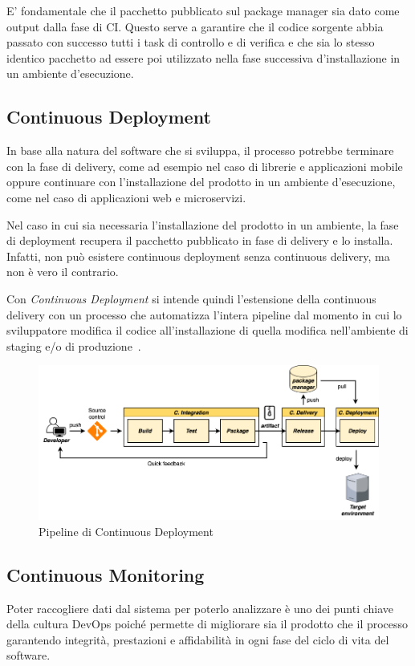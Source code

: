 E' fondamentale che il pacchetto pubblicato sul package manager sia dato come output dalla fase di CI. 
Questo serve a garantire che il codice sorgente abbia passato con successo tutti i task di controllo e di verifica e che sia lo stesso identico pacchetto ad essere poi utilizzato nella fase successiva d'installazione in un ambiente d'esecuzione. 

\subsection{Continuous Deployment}
In base alla natura del software che si sviluppa,
il processo potrebbe terminare con la fase di delivery, 
come ad esempio nel caso di librerie e applicazioni mobile oppure continuare con l'installazione del prodotto in un ambiente d'esecuzione,
come nel caso di applicazioni web e microservizi. 

Nel caso in cui sia necessaria l'installazione del prodotto in un ambiente, 
la fase di deployment recupera il pacchetto pubblicato in fase di delivery e lo installa. 
Infatti, 
non può esistere continuous deployment senza continuous delivery, 
ma non è vero il contrario.

Con \textit{Continuous Deployment} si intende quindi l'estensione della continuous delivery con un processo che automatizza l'intera pipeline dal momento in cui lo sviluppatore modifica il codice all'installazione di quella modifica nell'ambiente di staging e/o di produzione~\cite{krief2019learning}.

\begin{figure}[H]
    \centering
    \includegraphics[width=1\textwidth]{img/cdeploy-pipeline.png}
    \caption{Pipeline di Continuous Deployment}
    \label{cdeploy-pipeline}
\end{figure}

\subsection{Continuous Monitoring}
Poter raccogliere dati dal sistema per poterlo analizzare è uno dei punti chiave della cultura DevOps poiché permette di migliorare sia il prodotto che il processo garantendo integrità, 
prestazioni e affidabilità in ogni fase del ciclo di vita del software.

